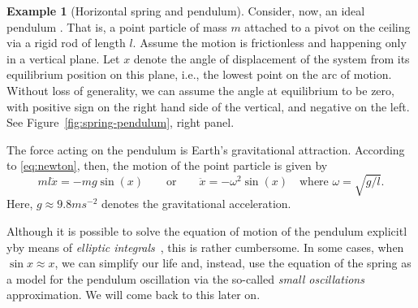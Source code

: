 \documentclass[english,fontsize=11pt,paper=b5]{scrbook}
\numberwithin{equation}{chapter}
\theoremstyle{definition}
\newtheorem{example}{Example}[chapter]
\newcommand{\emphidx}[1]{\index{#1}\emph{#1}}
\begin{document}
\begin{example}[Horizontal spring and pendulum]
    Consider, now, an ideal pendulum . That is, a point particle of mass $m$ attached to a pivot on the ceiling via a rigid rod of length $l$.
    Assume the motion is frictionless and happening only in a vertical plane.
    Let $x$ denote the angle of displacement of the system from its equilibrium position on this plane, i.e., the lowest point on the arc of motion.
    Without loss of generality, we can assume the angle at equilibrium to be zero, with positive sign on the right hand side of the vertical, and negative on the left. See Figure~\ref{fig:spring-pendulum}, right panel.

    The force acting on the pendulum is Earth's gravitational attraction.
    According to \eqref{eq:newton}, then, the motion of the point particle is given by
    \begin{equation}
      m l \ddot{x} = - m g \sin(x) \qquad\mbox{or}\qquad \ddot{x} = - \omega^2 \sin(x) \quad\mbox{where } \omega = \sqrt{g/l}.
    \end{equation}
    Here, $g \approx 9.8 m s^{-2}$ denotes the gravitational acceleration.

    Although it is possible to solve the equation of motion of the pendulum explicitl yby means of \emphidx{elliptic integrals}~\cite{elliptic}, this is rather cumbersome.
    In some cases, when $\sin x \approx x$, we can simplify our life and, instead, use the equation of the spring as a model for the pendulum oscillation via the so-called \emph{small oscillations} approximation.
    We will come back to this later on.
  \end{example}
\end{document}
